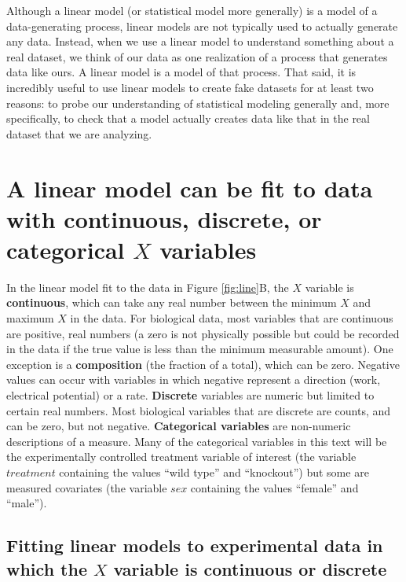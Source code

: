 \documentclass[]{book}
\begin{document}
Although a linear model (or statistical model more generally) is a model of a data-generating process, linear models are not typically used to actually generate any data. Instead, when we use a linear model to understand something about a real dataset, we think of our data as one realization of a process that generates data like ours. A linear model is a model of that process. That said, it is incredibly useful to use linear models to create fake datasets for at least two reasons: to probe our understanding of statistical modeling generally and, more specifically, to check that a model actually creates data like that in the real dataset that we are analyzing.

\hypertarget{a-linear-model-can-be-fit-to-data-with-continuous-discrete-or-categorical-x-variables}{%
\section{\texorpdfstring{A linear model can be fit to data with continuous, discrete, or categorical \(X\) variables}{A linear model can be fit to data with continuous, discrete, or categorical X variables}}\label{a-linear-model-can-be-fit-to-data-with-continuous-discrete-or-categorical-x-variables}}

In the linear model fit to the data in Figure \ref{fig:line}B, the \(X\) variable is \textbf{continuous}, which can take any real number between the minimum \(X\) and maximum \(X\) in the data. For biological data, most variables that are continuous are positive, real numbers (a zero is not physically possible but could be recorded in the data if the true value is less than the minimum measurable amount). One exception is a \textbf{composition} (the fraction of a total), which can be zero. Negative values can occur with variables in which negative represent a direction (work, electrical potential) or a rate. \textbf{Discrete} variables are numeric but limited to certain real numbers. Most biological variables that are discrete are counts, and can be zero, but not negative. \textbf{Categorical variables} are non-numeric descriptions of a measure. Many of the categorical variables in this text will be the experimentally controlled treatment variable of interest (the variable \(treatment\) containing the values ``wild type'' and ``knockout'') but some are measured covariates (the variable \(sex\) containing the values ``female'' and ``male'').

\hypertarget{fitting-linear-models-to-experimental-data-in-which-the-x-variable-is-continuous-or-discrete}{%
\subsection{\texorpdfstring{Fitting linear models to experimental data in which the \(X\) variable is continuous or discrete}{Fitting linear models to experimental data in which the X variable is continuous or discrete}}\label{fitting-linear-models-to-experimental-data-in-which-the-x-variable-is-continuous-or-discrete}}
\end{document}
